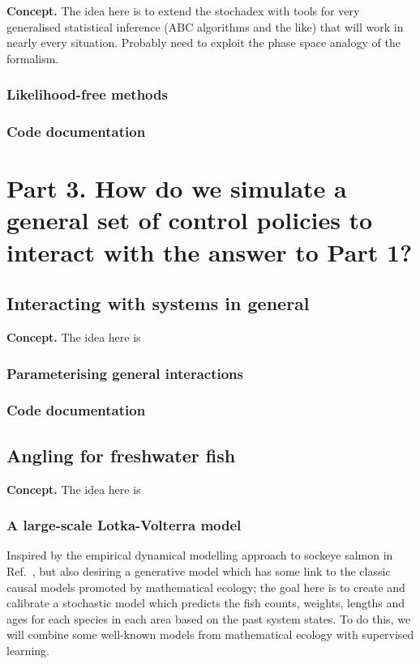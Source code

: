 \documentclass{book}
\begin{document}
{\bfseries\sffamily Concept.} The idea here is to extend the stochadex with tools for very generalised statistical inference (ABC algorithms and the like) that will work in nearly every situation. Probably need to exploit the phase space analogy of the formalism.

\section{\sffamily Likelihood-free methods}


\section{\sffamily Code documentation}


\part*{{\sffamily Part 3. {\color{gray75} How do we simulate a general set of control policies to interact with the answer to Part 1?}}}


\chapter{\sffamily Interacting with systems in general}

{\bfseries\sffamily Concept.} The idea here is 

\section{\sffamily Parameterising general interactions}


\section{\sffamily Code documentation}


\chapter{\sffamily Angling for freshwater fish}

{\bfseries\sffamily Concept.} The idea here is 

\section{\sffamily A large-scale Lotka-Volterra model}

Inspired by the empirical dynamical modelling approach to sockeye salmon in Ref.~\cite{ye2015equation}, but also desiring a generative model which has some link to the classic causal models promoted by mathematical ecology; the goal here is to create and calibrate a stochastic model which predicts the fish counts, weights, lengths and ages for each species in each area based on the past system states. To do this, we will combine some well-known models from mathematical ecology with supervised learning.
\end{document}
